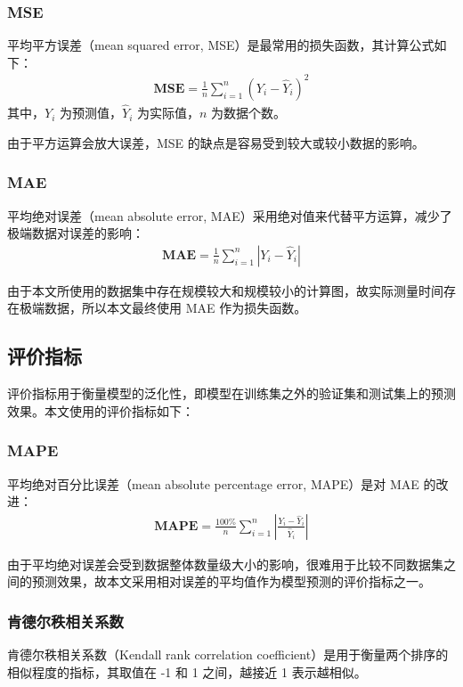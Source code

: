 \subsubsection{MSE\cite{MSE}}
平均平方误差（mean squared error, MSE）是最常用的损失函数，其计算公式如下：
\begin{align}
    \mathbf{MSE} = \frac 1n \sum \limits_{i=1}^n (Y_i - \hat{Y}_i)^2
\end{align}
其中，$Y_i$ 为预测值，$\hat{Y}_i$ 为实际值，$n$ 为数据个数。

由于平方运算会放大误差，MSE 的缺点是容易受到较大或较小数据的影响。

\subsubsection{MAE\cite{MAE}}
平均绝对误差（mean absolute error, MAE）采用绝对值来代替平方运算，减少了极端数据对误差的影响：
\begin{align}
    \mathbf{MAE} = \frac 1n \sum \limits_{i=1}^n |Y_i - \hat{Y}_i|
\end{align}

由于本文所使用的数据集中存在规模较大和规模较小的计算图，故实际测量时间存在极端数据，所以本文最终使用 MAE 作为损失函数。

\subsection{评价指标}
评价指标用于衡量模型的泛化性，即模型在训练集之外的验证集和测试集上的预测效果。本文使用的评价指标如下：

\subsubsection{MAPE\cite{MAPE}}
平均绝对百分比误差（mean absolute percentage error, MAPE）是对 MAE 的改进：
\begin{align}
    \mathbf{MAPE} = \frac{100\%}{n}\sum\limits_{i=1}^n\left|\frac{Y_i-\hat{Y}_i}{\hat{Y}_i}\right|
\end{align}

由于平均绝对误差会受到数据整体数量级大小的影响，很难用于比较不同数据集之间的预测效果，故本文采用相对误差的平均值作为模型预测的评价指标之一。

\subsubsection{肯德尔秩相关系数\cite{Kendall}}
肯德尔秩相关系数（Kendall rank correlation coefficient）是用于衡量两个排序的相似程度的指标，其取值在 -1 和 1 之间，越接近 1 表示越相似。

